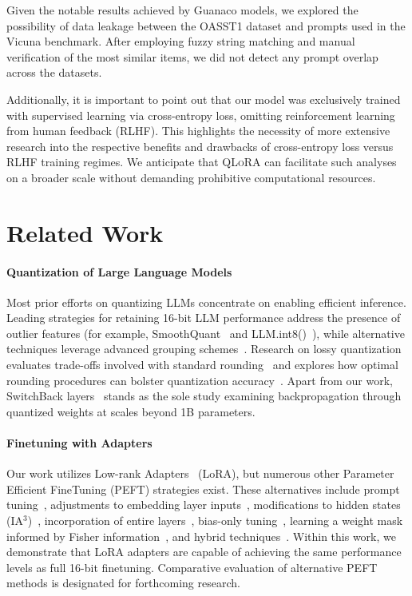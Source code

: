 Given the notable results achieved by {Guanaco} models, we explored the possibility of data leakage between the OASST1 dataset and prompts used in the Vicuna benchmark. After employing fuzzy string matching and manual verification of the most similar items, we did not detect any prompt overlap across the datasets.

Additionally, it is important to point out that our model was exclusively trained with supervised learning via cross-entropy loss, omitting reinforcement learning from human feedback (RLHF). This highlights the necessity of more extensive research into the respective benefits and drawbacks of cross-entropy loss versus RLHF training regimes. We anticipate that \textsc{QLoRA} can facilitate such analyses on a broader scale without demanding prohibitive computational resources.

\section{Related Work}

\paragraph{Quantization of Large Language Models} Most prior efforts on quantizing LLMs concentrate on enabling efficient inference. Leading strategies for retaining 16-bit LLM performance address the presence of outlier features (for example, SmoothQuant~\citep{xiao2022smoothquant} and LLM.int8()~\citep{dettmers2022llm}), while alternative techniques leverage advanced grouping schemes~\citep{park2022nuqmm, yao2022zeroquant}. Research on lossy quantization evaluates trade-offs involved with standard rounding~\citep{dettmers2022case, zeng2022glm, pope2022efficiently} and explores how optimal rounding procedures can bolster quantization accuracy~\citep{frantar2022gptq}. Apart from our work, SwitchBack layers~\citep{wortsman2023stable} stands as the sole study examining backpropagation through quantized weights at scales beyond 1B parameters.

\paragraph{Finetuning with Adapters} Our work utilizes Low-rank Adapters~\citep{hu2021lora} (LoRA), but numerous other Parameter Efficient FineTuning (PEFT) strategies exist. These alternatives include prompt tuning~\citep{qin2021learning,lester2021power,li2021prefix}, adjustments to embedding layer inputs~\citep{an2022input}, modifications to hidden states (IA$^3$)~\citep{liu2022few}, incorporation of entire layers~\citep{houlsby2019parameter}, bias-only tuning~\citep{zaken2021bitfit}, learning a weight mask informed by Fisher information~\citep{sung2021training}, and hybrid techniques~\citep{henderson2021compacter}. Within this work, we demonstrate that LoRA adapters are capable of achieving the same performance levels as full 16-bit finetuning. Comparative evaluation of alternative PEFT methods is designated for forthcoming research.

